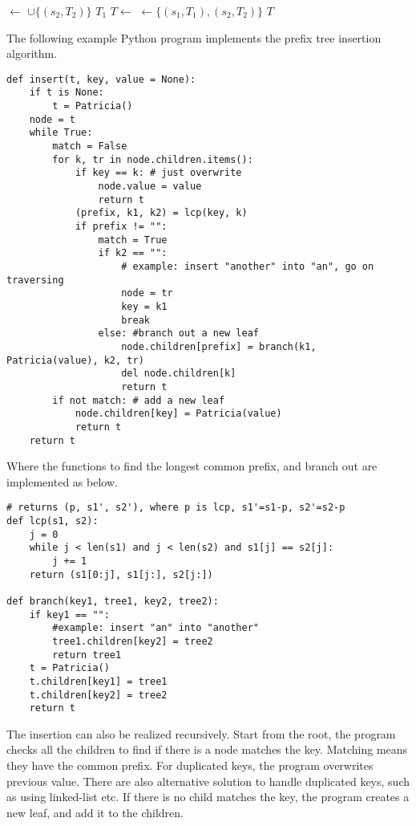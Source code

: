 \documentclass{article}
\begin{document}
\begin{algorithmic}[1]
    \State {} $\gets$  $\cup \{(s_2, T_2)\}$
    \State \Return $T_1$
  \EndIf
  \State $T \gets$ 
  \State {} $\gets \{(s_1, T_1), (s_2, T_2)\}$
  \State \Return $T$
\EndFunction
\end{algorithmic}

The following example Python program implements the prefix tree insertion algorithm.

\lstset{language=Python}
\begin{lstlisting}
def insert(t, key, value = None):
    if t is None:
        t = Patricia()
    node = t
    while True:
        match = False
        for k, tr in node.children.items():
            if key == k: # just overwrite
                node.value = value
                return t
            (prefix, k1, k2) = lcp(key, k)
            if prefix != "":
                match = True
                if k2 == "":
                    # example: insert "another" into "an", go on traversing
                    node = tr
                    key = k1
                    break
                else: #branch out a new leaf
                    node.children[prefix] = branch(k1, Patricia(value), k2, tr)
                    del node.children[k]
                    return t
        if not match: # add a new leaf
            node.children[key] = Patricia(value)
            return t
    return t
\end{lstlisting}

Where the functions to find the longest common prefix, and branch out are
implemented as below.

\begin{lstlisting}
# returns (p, s1', s2'), where p is lcp, s1'=s1-p, s2'=s2-p
def lcp(s1, s2):
    j = 0
    while j < len(s1) and j < len(s2) and s1[j] == s2[j]:
        j += 1
    return (s1[0:j], s1[j:], s2[j:])

def branch(key1, tree1, key2, tree2):
    if key1 == "":
        #example: insert "an" into "another"
        tree1.children[key2] = tree2
        return tree1
    t = Patricia()
    t.children[key1] = tree1
    t.children[key2] = tree2
    return t
\end{lstlisting}

The insertion can also be realized recursively. Start from the root,
the program checks all the children to find if there is a node matches
the key. Matching means they have the common
prefix. For duplicated keys, the program overwrites previous value.
There are also alternative solution to handle duplicated keys, such
as using linked-list etc. If there is no child matches the
key, the program creates a new leaf, and add it to the children.
\end{document}
